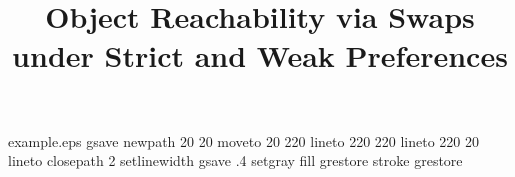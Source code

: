 %
%
%
%
%
\begin{filecontents*}{example.eps}
gsave
newpath
  20 20 moveto
  20 220 lineto
  220 220 lineto
  220 20 lineto
closepath
2 setlinewidth
gsave
  .4 setgray fill
grestore
stroke
grestore
\end{filecontents*}
%
\RequirePackage{fix-cm}
%
\documentclass{svjour3}                     %
%
\smartqed  %
%
\usepackage{graphicx}

\usepackage[numbers]{natbib}
\usepackage{tikz}
\usepackage{multirow}
\usepackage{threeparttable}
\usepackage{diagbox}
\usepackage{makecell}
\usepackage{subfigure}
\usepackage[ruled,linesnumbered,vlined]{algorithm2e}
%
%
%
%
%


\title{Object Reachability via Swaps under Strict and Weak Preferences%
}


